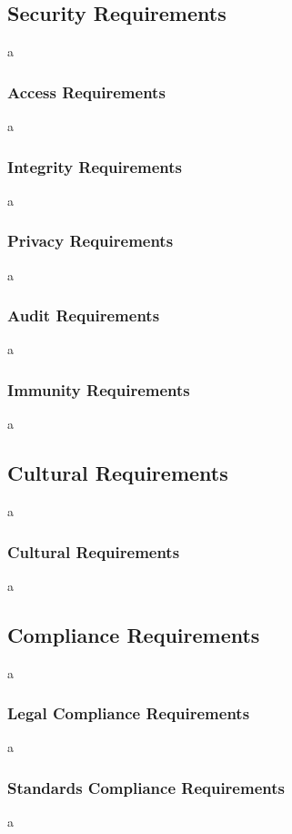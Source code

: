 \documentclass[12pt]{article}
\begin{document}
\subsection{Security Requirements}
a

\subsubsection{Access Requirements}
a

\subsubsection{Integrity Requirements}
a
\subsubsection{Privacy Requirements}
a

\subsubsection{Audit Requirements}
a

\subsubsection{Immunity Requirements}
a

\subsection{Cultural Requirements}
a

\subsubsection{Cultural Requirements}
a

\subsection{Compliance Requirements}
a

\subsubsection{Legal Compliance Requirements}
a

\subsubsection{Standards Compliance Requirements}
a
\end{document}
